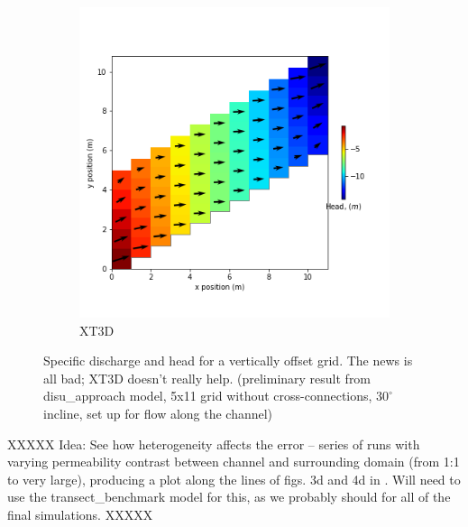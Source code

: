 \documentclass{article}
\begin{document}
\begin{figure}[H]
\begin{subfigure}{0.4\textwidth}
	\includegraphics[width=\textwidth]{../figures/disu-af-vo-x-head.png}
	\caption{XT3D}
	\label{fig:disu-x-nocc-head}
\end{subfigure}
\caption{Specific discharge and head for a vertically offset grid. The news is all bad; XT3D doesn't really help. (preliminary result from disu\_approach model, 5x11 grid without cross-connections, $30^{\circ}$ incline, set up for flow along the channel)}
\label{fig:figures}
\end{figure}

XXXXX Idea: See how heterogeneity affects the error -- series of runs with varying permeability contrast between channel and surrounding domain (from 1:1 to very large), producing a plot along the lines of figs. 3d and 4d in \cite{bardot2022}. Will need to use the transect\_benchmark model for this, as we probably should for all of the final simulations. XXXXX
\end{document}
